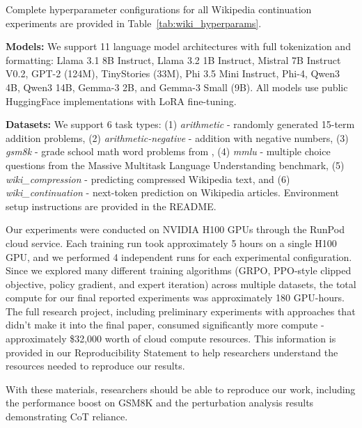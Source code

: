 \documentclass{article}
\begin{document}
Complete hyperparameter configurations for all Wikipedia continuation experiments are provided in Table~\ref{tab:wiki_hyperparams}.

\textbf{Models:} We support 11 language model architectures with full tokenization and formatting: Llama 3.1 8B Instruct, Llama 3.2 1B Instruct, Mistral 7B Instruct V0.2, GPT-2 (124M), TinyStories (33M), Phi 3.5 Mini Instruct, Phi-4, Qwen3 4B, Qwen3 14B, Gemma-3 2B, and Gemma-3 Small (9B). All models use public HuggingFace implementations with LoRA fine-tuning.

\textbf{Datasets:} We support 6 task types: (1) \textit{arithmetic} - randomly generated 15-term addition problems, (2) \textit{arithmetic-negative} - addition with negative numbers, (3) \textit{gsm8k} - grade school math word problems from \citet{cobbe2021gsm8k}, (4) \textit{mmlu} - multiple choice questions from the Massive Multitask Language Understanding benchmark, (5) \textit{wiki\_compression} - predicting compressed Wikipedia text, and (6) \textit{wiki\_continuation} - next-token prediction on Wikipedia articles. Environment setup instructions are provided in the README. 

Our experiments were conducted on NVIDIA H100 GPUs through the RunPod cloud service. Each training run took approximately 5 hours on a single H100 GPU, and we performed 4 independent runs for each experimental configuration. Since we explored many different training algorithms (GRPO, PPO-style clipped objective, policy gradient, and expert iteration) across multiple datasets, the total compute for our final reported experiments was approximately 180 GPU-hours. The full research project, including preliminary experiments with approaches that didn't make it into the final paper, consumed significantly more compute - approximately \$32,000 worth of cloud compute resources. This information is provided in our Reproducibility Statement to help researchers understand the resources needed to reproduce our results.

With these materials, researchers should be able to reproduce our work, including the performance boost on GSM8K and the perturbation analysis results demonstrating CoT reliance.



\end{document}

